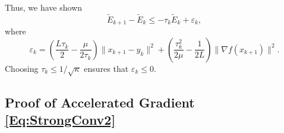 \documentclass[11pt]{article}
\theoremstyle{plain}
\begin{document}
Thus, we have shown
\begin{equation}
\tilde E_{k+1} -\tilde  E_k \leq -\tau_k \tilde E_k + \varepsilon_k, 
\end{equation}
where 
\begin{equation}
 \varepsilon_k  = \left( \frac{L\tau_k}{2}- \frac{\mu}{2\tau_k}\right)\|x_{k+1} - y_k\|^2  + \left(\frac{\tau_k^2}{2\mu}-\frac{1}{2L}\right)\|\nabla f(x_{k+1})\|^2.   
\end{equation}
Choosing $\tau_k \leq 1/\sqrt{\kappa}$ ensures that $\varepsilon_k \leq 0$. 


\subsection{Proof of Accelerated Gradient \eqref{Eq:StrongConv2}}
\end{document}
